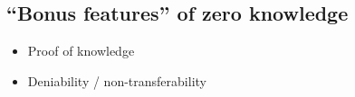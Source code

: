 \subsection{``Bonus features'' of zero
knowledge}\label{Bonus-features-of-zero-kn}

\begin{itemize}
\item
  Proof of knowledge
\item
  Deniability / non-transferability
\end{itemize}
